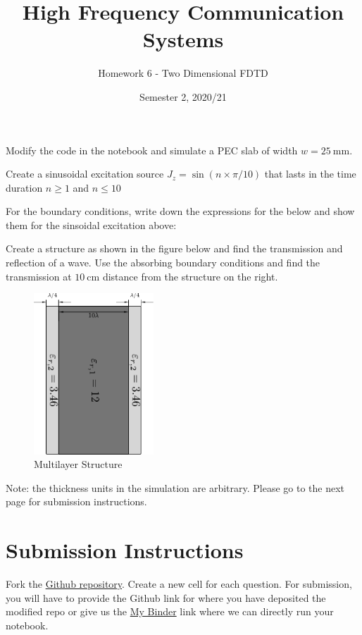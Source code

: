 \documentclass[addpoints]{exam}
\title{High Frequency Communication Systems}
\author{Homework 6 - Two Dimensional FDTD}
\date{Semester 2, 2020/21}
\begin{document}
\maketitle


\begin{questions}
    \pointsinrightmargin 
    \bracketedpoints
\question[3] Modify the code in the notebook and simulate a PEC slab of width  $w = \SI{25}{\mm}$.

\question[2] Create a sinusoidal excitation source $J_z = \sin(n\times\pi/10)$ that lasts in the time duration $n \ge 1$ and $n \le 10$

\question
For the boundary conditions, write down the expressions for the below and show them for the sinsoidal excitation above:


\question[5]

Create a structure as shown in the figure below and find the transmission and reflection of a wave. Use the absorbing boundary conditions and find the transmission at $\SI{10}{\cm}$ distance from the structure on the right.

\begin{figure}[htbp]
    \centering
    \includegraphics[width=0.4\textwidth]{homework_FDTD_problem3.pdf}
    \caption{Multilayer Structure}
\end{figure}

Note: the thickness units in the simulation are arbitrary. Please go to the next page for submission instructions.

\end{questions}

\section*{Submission Instructions}
Fork the \href{https://github.com/hasantahir/HFCS_lecture}{Github repository}. Create a new cell for each question. For submission, you will have to provide the Github link for where you have deposited the modified repo or give us the \href{https://mybinder.org/}{My Binder} link where we can directly run your notebook.
\end{document}
